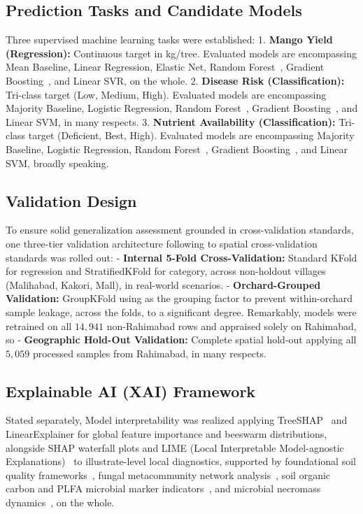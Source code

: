 \documentclass[runningheads,a4paper,oribibl]{llncs}
\begin{document}
\subsection{Prediction Tasks and Candidate Models}
Three supervised machine learning tasks were established:
1. \textbf{Mango Yield (Regression):} Continuous target in kg/tree. Evaluated models are encompassing Mean Baseline, Linear Regression, Elastic Net, Random Forest~\cite{breiman2001}, Gradient Boosting~\cite{friedman2001}, and Linear SVR, on the whole.
2. \textbf{Disease Risk (Classification):} Tri-class target (Low, Medium, High). Evaluated models are encompassing Majority Baseline, Logistic Regression, Random Forest~\cite{breiman2001}, Gradient Boosting~\cite{friedman2001}, and Linear SVM, in many respects.
3. \textbf{Nutrient Availability (Classification):} Tri-class target (Deficient, Best, High). Evaluated models are encompassing Majority Baseline, Logistic Regression, Random Forest~\cite{breiman2001}, Gradient Boosting~\cite{friedman2001}, and Linear SVM, broadly speaking.

\subsection{Validation Design}
To ensure solid generalization assessment grounded in cross-validation standards\cite{kohavi1995}, one three-tier validation architecture following to spatial cross-validation standards\cite{roberts2017} was rolled out:
- \textbf{Internal 5-Fold Cross-Validation:} Standard KFold for regression and StratifiedKFold for category, across non-holdout villages (Malihabad, Kakori, Mall), in real-world scenarios.
- \textbf{Orchard-Grouped Validation:} GroupKFold using  as the grouping factor to prevent within-orchard sample leakage, across the folds, to a significant degree.
Remarkably, models were retrained on all $14{,}941$ non-Rahimabad rows and appraised solely on Rahimabad, so - \textbf{Geographic Hold-Out Validation:} Complete spatial hold-out applying all $5{,}059$ processed samples from Rahimabad, in many respects.

\subsection{Explainable AI (XAI) Framework}
Stated separately, Model interpretability was realized applying TreeSHAP~\cite{lundberg2017} and LinearExplainer for global feature importance and beeswarm distributions, alongside SHAP waterfall plots and LIME (Local Interpretable Model-agnostic Explanations)~\cite{ribeiro2016} to illustrate-level local diagnostics, supported by foundational soil quality frameworks~\cite{bunemann2018}, fungal metacommunity network analysis~\cite{toju2018}, soil organic carbon and PLFA microbial marker indicators~\cite{fanin2019}, and microbial necromass dynamics~\cite{liang2020}, on the whole.
\end{document}
